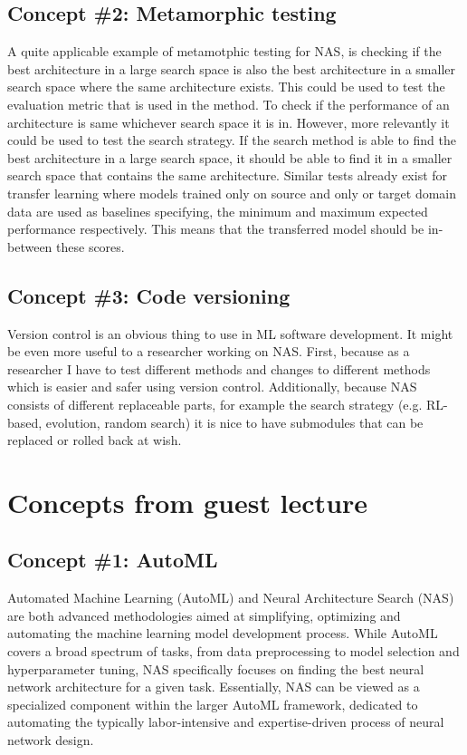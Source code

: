 \documentclass[11pt,a4paper]{article}
\begin{document}
\subsection*{Concept \#2: Metamorphic testing}
A quite applicable example of metamotphic testing for NAS, is checking if the best architecture in a large search space is also the best architecture in a smaller search space where the same architecture exists. This could be used to test the evaluation metric that is used in the method. To check if the performance of an architecture is same whichever search space it is in. However, more relevantly it could be used to test the search strategy. If the search method is able to find the best architecture in a large search space, it should be able to find it in a smaller search space that contains the same architecture. Similar tests already exist for transfer learning where models trained only on source and only or target domain data are used as baselines specifying, the minimum and maximum expected performance respectively. This means that the transferred model should be in-between these scores.

\subsection*{Concept \#3: Code versioning}
Version control is an obvious thing to use in ML software development. It might be even more useful to a researcher working on NAS. First, because as a researcher I have to test different methods and changes to different methods which is easier and safer using version control. Additionally, because NAS consists of different replaceable parts, for example the search strategy (e.g. RL-based, evolution, random search) it is nice to have submodules that can be replaced or rolled back at wish.

\section*{Concepts from guest lecture}
\subsection*{Concept \#1: AutoML}
Automated Machine Learning (AutoML) and Neural Architecture Search (NAS) are both advanced methodologies aimed at simplifying, optimizing and automating the machine learning model development process. While AutoML covers a broad spectrum of tasks, from data preprocessing to model selection and hyperparameter tuning, NAS specifically focuses on finding the best neural network architecture for a given task. Essentially, NAS can be viewed as a specialized component within the larger AutoML framework, dedicated to automating the typically labor-intensive and expertise-driven process of neural network design. 
\end{document}
